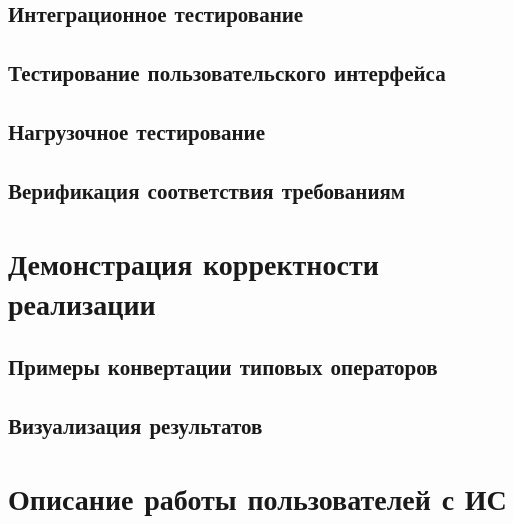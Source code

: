 \subsection{Интеграционное тестирование}

\subsection{Тестирование пользовательского интерфейса}

\subsection{Нагрузочное тестирование}

\subsection{Верификация соответствия требованиям}

\section{Демонстрация корректности реализации}

\subsection{Примеры конвертации типовых операторов}

\subsection{Визуализация результатов}

\section{Описание работы пользователей с ИС}

